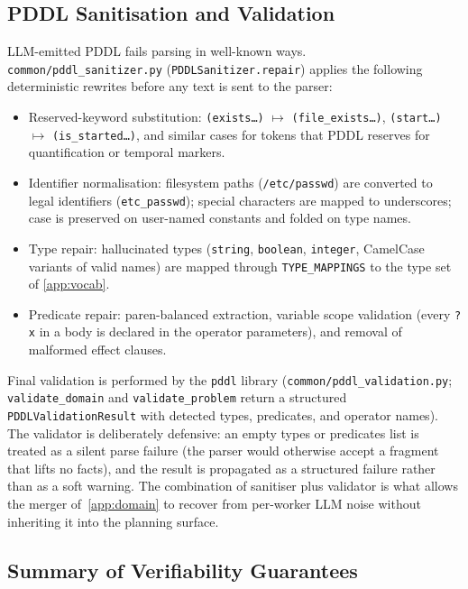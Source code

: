 \subsection{PDDL Sanitisation and Validation}
\label{app:validation}

LLM-emitted PDDL fails parsing in well-known ways. \texttt{common/pddl\_sanitizer.py} (\texttt{PDDLSanitizer.repair}) applies the following deterministic rewrites before any text is sent to the parser:

\begin{itemize}
  \item Reserved-keyword substitution: \texttt{(exists\dots)} $\mapsto$ \texttt{(file\_exists\dots)}, \texttt{(start\dots)} $\mapsto$ \texttt{(is\_started\dots)}, and similar cases for tokens that PDDL reserves for quantification or temporal markers.
  \item Identifier normalisation: filesystem paths (\texttt{/etc/passwd}) are converted to legal identifiers (\texttt{etc\_passwd}); special characters are mapped to underscores; case is preserved on user-named constants and folded on type names.
  \item Type repair: hallucinated types (\texttt{string}, \texttt{boolean}, \texttt{integer}, CamelCase variants of valid names) are mapped through \texttt{TYPE\_MAPPINGS} to the type set of \ref{app:vocab}.
  \item Predicate repair: paren-balanced extraction, variable scope validation (every \texttt{?x} in a body is declared in the operator parameters), and removal of malformed effect clauses.
\end{itemize}

Final validation is performed by the \texttt{pddl} library (\texttt{common/pddl\_validation.py}; \texttt{validate\_domain} and \texttt{validate\_problem} return a structured \texttt{PDDLValidationResult} with detected types, predicates, and operator names). The validator is deliberately defensive: an empty types or predicates list is treated as a silent parse failure (the parser would otherwise accept a fragment that lifts no facts), and the result is propagated as a structured failure rather than as a soft warning. The combination of sanitiser plus validator is what allows the merger of~\ref{app:domain} to recover from per-worker LLM noise without inheriting it into the planning surface.

\subsection{Summary of Verifiability Guarantees}
\label{app:summary}

